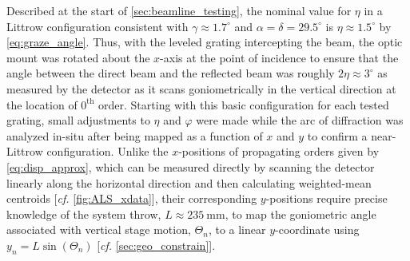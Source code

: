Described at the start of \cref{sec:beamline_testing}, the nominal value for $\eta$ in a Littrow configuration consistent with $\gamma \approx 1.7^{\circ}$ and $\alpha = \delta = 29.5^{\circ}$ is $\eta \approx 1.5^{\circ}$ by \cref{eq:graze_angle}. 
Thus, with the leveled grating intercepting the beam, the optic mount was rotated about the $x$-axis at the point of incidence to ensure that the angle between the direct beam and the reflected beam was roughly $2 \eta \approx 3^{\circ}$ as measured by the detector as it scans goniometrically in the vertical direction at the location of $0^{\text{th}}$ order. 
Starting with this basic configuration for each tested grating, small adjustments to $\eta$ and $\varphi$ were made while the arc of diffraction was analyzed in-situ after being mapped as a function of $x$ and $y$ to confirm a near-Littrow configuration. 
Unlike the $x$-positions of propagating orders given by \cref{eq:disp_approx}, which can be measured directly by scanning the detector linearly along the horizontal direction and then calculating weighted-mean centroids [\emph{cf.\@} \cref{fig:ALS_xdata}], their corresponding $y$-positions require precise knowledge of the system throw, $L \approx \SI{235}{\mm}$, to map the goniometric angle associated with vertical stage motion, $\Theta_n$, to a linear $y$-coordinate using $y_n = L \sin \left( \Theta_n \right)$ [\emph{cf.\@} \cref{sec:geo_constrain}]. 

